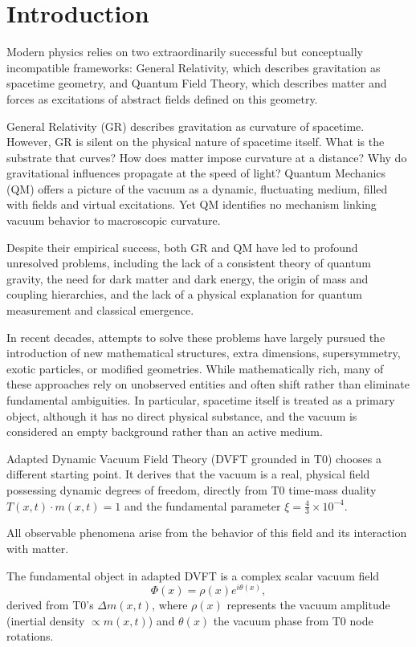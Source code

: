 	\section{Introduction}
	
	Modern physics relies on two extraordinarily successful but conceptually incompatible frameworks:
	General Relativity, which describes gravitation as spacetime geometry, and Quantum Field Theory, which describes matter and forces as excitations of abstract fields defined on this geometry.
	
	General Relativity (GR) describes gravitation as curvature of spacetime.
	However, GR is silent on the physical nature of spacetime itself.
	What is the substrate that curves?
	How does matter impose curvature at a distance?
	Why do gravitational influences propagate at the speed of light?
	Quantum Mechanics (QM)
	offers a picture of the vacuum as a dynamic, fluctuating medium, filled with fields and virtual excitations.
	Yet QM identifies no mechanism linking vacuum behavior to macroscopic curvature.
	
	Despite their empirical success, both GR and QM have led to profound unresolved problems, including
	the lack of a consistent theory of quantum gravity, the need for dark matter and dark energy, the origin
	of mass and coupling hierarchies, and the lack of a physical explanation for quantum measurement and
	classical emergence.
	
	In recent decades, attempts to solve these problems have largely pursued the introduction of new mathematical structures, extra dimensions, supersymmetry, exotic particles, or modified geometries.
	While mathematically rich, many of these approaches rely on unobserved entities and often shift rather than eliminate fundamental ambiguities.
	In particular, spacetime itself is treated as a primary object, although it has no direct physical substance, and the vacuum is considered an empty background rather than an active medium.
	
	Adapted Dynamic Vacuum Field Theory (DVFT grounded in T0) chooses a different starting point.
	It derives that the vacuum is a real, physical field possessing dynamic degrees of freedom, directly from T0 time-mass duality $T(x,t) \cdot m(x,t) = 1$ and the fundamental parameter $\xi = \frac{4}{3} \times 10^{-4}$.
	
	All observable phenomena arise from the behavior of this field and its interaction with matter.
	
	The fundamental object in adapted DVFT is a complex scalar vacuum field
	\[
	\Phi(x)=\rho(x)e^{i\theta(x)},
	\]
	derived from T0's $\Delta m(x,t)$, where $\rho(x)$ represents the vacuum amplitude (inertial density $\propto m(x,t)$) and $\theta(x)$
	the vacuum phase from T0 node rotations.
	
